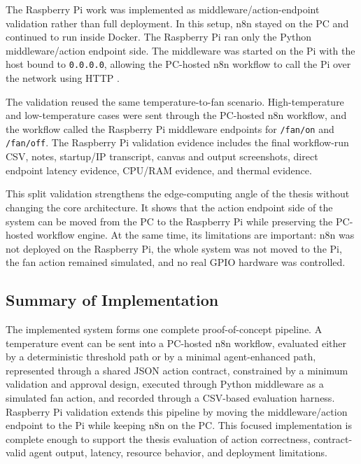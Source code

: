 The Raspberry Pi work was implemented as middleware/action-endpoint validation rather than full deployment. In this setup, n8n stayed on the PC and continued to run inside Docker. The Raspberry Pi ran only the Python middleware/action endpoint side. The middleware was started on the Pi with the host bound to \texttt{0.0.0.0}, allowing the PC-hosted n8n workflow to call the Pi over the network using HTTP \cite{raspberryPiDocs}.

The validation reused the same temperature-to-fan scenario. High-temperature and low-temperature cases were sent through the PC-hosted n8n workflow, and the workflow called the Raspberry Pi middleware endpoints for \texttt{/fan/on} and \texttt{/fan/off}. The Raspberry Pi validation evidence includes the final workflow-run CSV, notes, startup/IP transcript, canvas and output screenshots, direct endpoint latency evidence, CPU/RAM evidence, and thermal evidence.

This split validation strengthens the edge-computing angle of the thesis without changing the core architecture. It shows that the action endpoint side of the system can be moved from the PC to the Raspberry Pi while preserving the PC-hosted workflow engine. At the same time, its limitations are important: n8n was not deployed on the Raspberry Pi, the whole system was not moved to the Pi, the fan action remained simulated, and no real GPIO hardware was controlled.

\subsection{Summary of Implementation}\label{subsec:implementation-summary}

The implemented system forms one complete proof-of-concept pipeline. A temperature event can be sent into a PC-hosted n8n workflow, evaluated either by a deterministic threshold path or by a minimal agent-enhanced path, represented through a shared JSON action contract, constrained by a minimum validation and approval design, executed through Python middleware as a simulated fan action, and recorded through a CSV-based evaluation harness. Raspberry Pi validation extends this pipeline by moving the middleware/action endpoint to the Pi while keeping n8n on the PC. This focused implementation is complete enough to support the thesis evaluation of action correctness, contract-valid agent output, latency, resource behavior, and deployment limitations.
